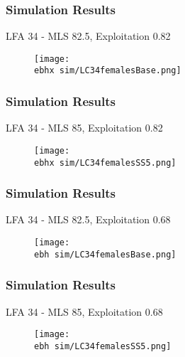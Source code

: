 \documentclass{beamer}
\newcommand{\ebh}{\string~/bio.data/bio.lobster/figures/LFA3438Framework2019/} %
\newcommand{\ebhx}{\string~/bio.data/bio.lobster/figures/LFA3438Framework2019/figures/Brad/} %
\begin{document}
\begin{frame}
\frametitle{Simulation Results}
LFA 34 - MLS 82.5, Exploitation 0.82
\begin{figure}
        \begin{center}
            \texttt{[image: \\ebhx sim/LC34femalesBase.png]}
        \end{center}
    \end{figure}
\end{frame}



\begin{frame}
\frametitle{Simulation Results}
LFA 34 - MLS 85, Exploitation 0.82
\begin{figure}
        \begin{center}
            \texttt{[image: \\ebhx sim/LC34femalesSS5.png]}
        \end{center}
    \end{figure}
\end{frame}



\begin{frame}
\frametitle{Simulation Results}
LFA 34 - MLS 82.5, Exploitation 0.68
\begin{figure}
        \begin{center}
            \texttt{[image: \\ebh sim/LC34femalesBase.png]}
        \end{center}
    \end{figure}
\end{frame}



\begin{frame}
\frametitle{Simulation Results}
LFA 34 - MLS 85, Exploitation 0.68
\begin{figure}
        \begin{center}
            \texttt{[image: \\ebh sim/LC34femalesSS5.png]}
        \end{center}
    \end{figure}
\end{frame}





\end{document}
